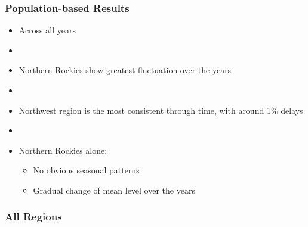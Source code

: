 \documentclass{beamer}
\begin{document}
\begin{frame}
\frametitle{Population-based Results}
\begin{itemize}
\item Across all years

\item[]

\item Northern Rockies show greatest fluctuation over the years

\item[]

\item Northwest region is the most consistent through time, with around 1\% delays

\item[]

\item Northern Rockies alone:
\begin{itemize}
\item No obvious seasonal patterns
\item Gradual change of mean level over the years
\end{itemize}

\end{itemize}
\end{frame}



\begin{frame}
\frametitle{All Regions}
\begin{center}
\end{center}
\end{frame}
\end{document}

